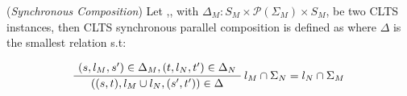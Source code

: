 \begin{definition} 
	\label{def:synchronous_composition}(\emph{Synchronous Composition}) Let ,, with $\Delta_M : S_M \times \mathcal{P}(\Sigma_M) \times S_M$, be two CLTS instances, then CLTS synchronous parallel composition is defined as  where $\Delta$ is the smallest relation s.t:
	\begin{center}
		\begin{equation}
		\AxiomC{$(s, l_M, s') \in \Delta_M,(t, l_N, t') \in \Delta_N  $}\RightLabel{$l_M \cap \Sigma_N = l_N \cap \Sigma_M$}
		\UnaryInfC{$((s,t),l_M \cup l_N,(s',t')) \in \Delta$}
		\DisplayProof	
		\end{equation}	
	\end{center}
\end{definition}


